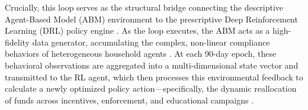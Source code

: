 Crucially, this loop serves as the structural bridge connecting the descriptive Agent-Based Model (ABM) environment to the prescriptive Deep Reinforcement Learning (DRL) policy engine \citep{Kompella2020}. As the loop executes, the ABM acts as a high-fidelity data generator, accumulating the complex, non-linear compliance behaviors of heterogeneous household agents \citep{TianReview2024}. At each 90-day epoch, these behavioral observations are aggregated into a multi-dimensional state vector and transmitted to the RL agent, which then processes this environmental feedback to calculate a newly optimized policy action—specifically, the dynamic reallocation of funds across incentives, enforcement, and educational campaigns \citep{HaMinh2025}.
